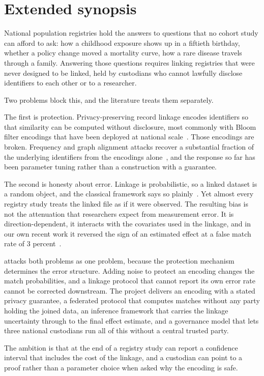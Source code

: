 \section{Extended synopsis}
\label{sec:synopsis}

National population registries hold the answers to questions that no cohort study can afford to
ask: how a childhood exposure shows up in a fiftieth birthday, whether a policy change moved a
mortality curve, how a rare disease travels through a family. Answering those questions requires
linking registries that were never designed to be linked, held by custodians who cannot lawfully
disclose identifiers to each other or to a researcher.

Two problems block this, and the literature treats them separately.

The first is protection. Privacy-preserving record linkage encodes identifiers so that similarity
can be computed without disclosure, most commonly with Bloom filter encodings that have been
deployed at national scale~\cite{schnell2009bloom}. Those encodings are broken. Frequency and
graph alignment attacks recover a substantial fraction of the underlying identifiers from the
encodings alone~\cite{christen2018attack,haugsdal2022graphattack}, and the response so far has been
parameter tuning rather than a construction with a guarantee.

The second is honesty about error. Linkage is probabilistic, so a linked dataset is a random object,
and the classical framework says so plainly~\cite{fellegi1969theory}. Yet almost every registry
study treats the linked file as if it were observed. The resulting bias is not the attenuation that
researchers expect from measurement error. It is direction-dependent, it interacts with the
covariates used in the linkage, and in our own recent work it reversed the sign of an estimated
effect at a false match rate of 3 percent~\cite{okparalange2025linkageerror}.

\proj{} attacks both problems as one problem, because the protection mechanism determines the error
structure. Adding noise to protect an encoding changes the match probabilities, and a linkage
protocol that cannot report its own error rate cannot be corrected downstream. The project delivers
an encoding with a stated privacy guarantee, a federated protocol that computes matches without any
party holding the joined data, an inference framework that carries the linkage uncertainty through
to the final effect estimate, and a governance model that lets three national custodians run all of
this without a central trusted party.

The ambition is that at the end of \proj{} a registry study can report a confidence interval that
includes the cost of the linkage, and a custodian can point to a proof rather than a parameter
choice when asked why the encoding is safe.
